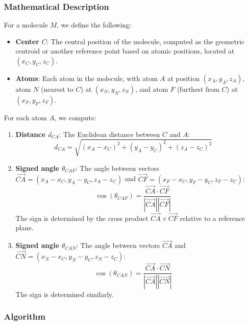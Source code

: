 \documentclass{article}
\begin{document}
\subsubsection{Mathematical Description}

For a molecule \( M \), we define the following:

\begin{itemize}
  \item \textbf{Center \( C \)}: The central position of the molecule, computed as the geometric centroid or another reference point based on atomic positions, located at \( (x_C, y_C, z_C) \).
  \item \textbf{Atoms}: Each atom in the molecule, with atom \( A \) at position \( (x_A, y_A, z_A) \), atom \( N \) (nearest to \( C \)) at \( (x_N, y_N, z_N) \), and atom \( F \) (furthest from \( C \)) at \( (x_F, y_F, z_F) \).
\end{itemize}

For each atom \( A \), we compute:

\begin{enumerate}
  \item \textbf{Distance \( d_{CA} \)}: The Euclidean distance between \( C \) and \( A \):
    \[
    d_{CA} = \sqrt{(x_A - x_C)^2 + (y_A - y_C)^2 + (z_A - z_C)^2}
    \]
  \item \textbf{Signed angle \( \theta_{CAF} \)}: The angle between vectors \( \vec{CA} = (x_A - x_C, y_A - y_C, z_A - z_C) \) and \( \vec{CF} = (x_F - x_C, y_F - y_C, z_F - z_C) \):
    \[
    \cos(\theta_{CAF}) = \frac{\vec{CA} \cdot \vec{CF}}{|\vec{CA}| |\vec{CF}|}
    \]
    The sign is determined by the cross product \( \vec{CA} \times \vec{CF} \) relative to a reference plane.
  \item \textbf{Signed angle \( \theta_{CAN} \)}: The angle between vectors \( \vec{CA} \) and \( \vec{CN} = (x_N - x_C, y_N - y_C, z_N - z_C) \):
    \[
    \cos(\theta_{CAN}) = \frac{\vec{CA} \cdot \vec{CN}}{|\vec{CA}| |\vec{CN}|}
    \]
    The sign is determined similarly.
\end{enumerate}

\subsubsection{Algorithm}
\end{document}
